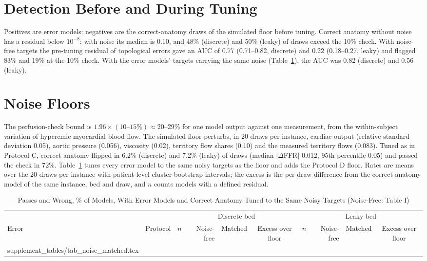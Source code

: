 \documentclass[journal,twoside,web,onecolumn]{ieeecolor}
\begin{document}
\FloatBarrier
{}
\section{Detection Before and During Tuning}\label{sec:detector}
Positives are error models; negatives are the correct-anatomy draws of the simulated floor before tuning. Correct anatomy without noise has a residual below $10^{-8}$; with noise its median is 0.10, and 48\% (discrete) and 50\% (leaky) of draws exceed the 10\% check. With noise-free targets the pre-tuning residual of topological errors gave an AUC of 0.77 (0.71--0.82, discrete) and 0.22 (0.18--0.27, leaky) and flagged 83\% and 19\% at the 10\% check. With the error models' targets carrying the same noise (Table~\ref{tab:matched}), the AUC was 0.82 (discrete) and 0.56 (leaky).

\FloatBarrier
{}
\section{Noise Floors}\label{sec:floor}
The perfusion-check bound is $1.96 \times (10\text{--}15\%) \approx 20$--29\% for one model output against one
measurement, from the within-subject variation of hyperemic myocardial blood flow. The simulated floor perturbs,
in 20 draws per instance, cardiac output (relative standard deviation 0.05), aortic pressure (0.056), viscosity (0.02),
territory flow shares (0.10) and the measured territory flows (0.083). Tuned as in Protocol C, correct anatomy flipped in 6.2\% (discrete) and 7.2\% (leaky) of draws (median $|\Delta$FFR$|$ 0.012, 95th percentile 0.05) and passed the check in 72\%.
Table~\ref{tab:matched} tunes every error model to the same noisy targets as the floor and adds the Protocol D floor. Rates are means over the 20 draws per instance with patient-level cluster-bootstrap intervals; the excess is the per-draw difference from the correct-anatomy model of the same instance, bed and draw, and $n$ counts models with a defined residual.
\begin{table}[!ht]
\caption{Passes and Wrong, \% of Models, With Error Models and Correct Anatomy Tuned to the Same Noisy Targets (Noise-Free: Table I)}\label{tab:matched}
\centering\footnotesize\setlength{\tabcolsep}{4pt}
\begin{tabular}{@{}llrrccrrcc@{}}
\toprule
 & & \multicolumn{4}{c}{Discrete bed} & \multicolumn{4}{c}{Leaky bed}\\
\cmidrule(lr){3-6}\cmidrule(l){7-10}
Error & Protocol & $n$ & Noise-free & Matched & Excess over floor & $n$ & Noise-free & Matched & Excess over floor\\
\midrule
{} supplement_tables/tab_noise_matched.tex 
\bottomrule
\end{tabular}
\end{table}
\end{document}
